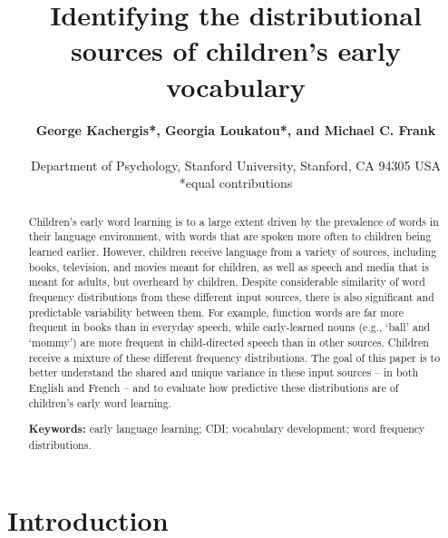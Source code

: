 \documentclass[10pt, letterpaper]{article}
\title{Identifying the distributional sources of children's early vocabulary}
\author{{\large \bf George Kachergis*, Georgia Loukatou*, and Michael C. Frank } \AND {\large \bf  {kachergis, loukatou, mcfrank}@stanford.edu} \\  \newline\\ Department of Psychology, Stanford University, Stanford, CA 94305 USA\\ *equal contributions}
\begin{document}
\maketitle

\begin{abstract}
Children's early word learning is to a large extent driven by the
prevalence of words in their language environment, with words that are
spoken more often to children being learned earlier. However, children
receive language from a variety of sources, including books, television,
and movies meant for children, as well as speech and media that is meant
for adults, but overheard by children. Despite considerable similarity
of word frequency distributions from these different input sources,
there is also significant and predictable variability between them. For
example, function words are far more frequent in books than in everyday
speech, while early-learned nouns (e.g., `ball' and `mommy') are more
frequent in child-directed speech than in other sources. Children
receive a mixture of these different frequency distributions. The goal
of this paper is to better understand the shared and unique variance in
these input sources -- in both English and French -- and to evaluate how
predictive these distributions are of children's early word learning.

\textbf{Keywords:}
early language learning; CDI; vocabulary development; word frequency
distributions.
\end{abstract}

\hypertarget{introduction}{%
\section{Introduction}\label{introduction}}
\end{document}

